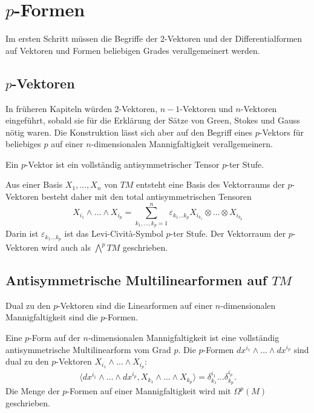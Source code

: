 %
%
\section{$p$-Formen
\label{buch:pformen:section:pformen}}
Im ersten Schritt müssen die Begriffe der 2-Vektoren und der 
Differentialformen auf Vektoren und Formen beliebigen Grades
verallgemeinert werden.

%
%
\subsection{$p$-Vektoren}
In früheren Kapiteln würden 2-Vektoren, $n-1$-Vektoren und $n$-Vektoren
eingeführt, sobald sie für die Erklärung der Sätze von Green,
Stokes und Gauss nötig waren.
Die Konstruktion lässt sich aber auf den Begriff eines $p$-Vektors
für beliebiges $p$ auf einer $n$-dimensionalen Mannigfaltigkeit
verallgemeinern.

\begin{definition}
Ein $p$-Vektor ist ein vollständig antisymmetrischer Tensor
$p$-ter Stufe.
\end{definition}

Aus einer Basis $X_1,\dots,X_n$ von $TM$ entsteht eine Basis des
Vektorraums der $p$-Vektoren besteht daher mit den
total antisymmetrischen Tensoren
\[
X_{i_1}\wedge \dots\wedge X_{i_p}
=
\sum_{k_1,\dots,k_p=1}^{n}
\varepsilon_{k_1\dots k_p}
X_{i_{k_1}}\otimes\dots\otimes X_{i_{k_p}}
\]
Darin ist $\varepsilon_{k_1\dots k_p}$ ist das Levi-Cività-Symbol
$p$-ter Stufe.
Der Vektorraum der $p$-Vektoren wird auch als 
$\bigwedge^p TM$ geschrieben.

%
%
\subsection{Antisymmetrische Multilinearformen auf $TM$}
Dual zu den $p$-Vektoren sind die Linearformen auf einer $n$-dimensionalen
Mannigfaltigkeit sind die $p$-Formen.

\begin{definition}
Eine $p$-Form auf der $n$-dimensionalen Mannigfaltigkeit ist eine vollständig
antisymmetrische Multilinearform vom Grad $p$.
Die $p$-Formen $dx^{i_1}\wedge\dots\wedge dx^{i_p}$ sind dual zu den 
$p$-Vektoren $X_{i_1}\wedge\dots\wedge X_{i_p}$:
\[
\langle
dx^{i_1}\wedge\dots\wedge dx^{i_p},
X_{k_1}\wedge\dots\wedge X_{k_p}
\rangle
=
\delta^{i_1}_{k_1}
\dots
\delta^{i_p}_{k_p}.
\]
Die Menge der $p$-Formen auf einer Mannigfaltigkeit wird mit $\Omega^p(M)$
geschrieben.
\end{definition}

